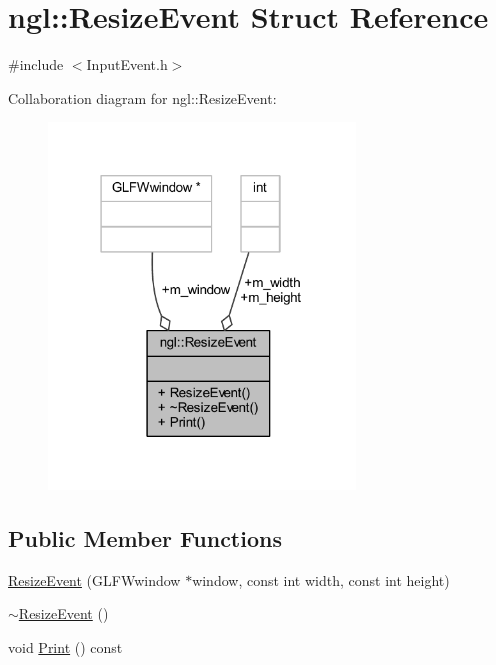 \hypertarget{structngl_1_1_resize_event}{}\section{ngl\+:\+:Resize\+Event Struct Reference}
\label{structngl_1_1_resize_event}


{\ttfamily \#include $<$Input\+Event.\+h$>$}



Collaboration diagram for ngl\+:\+:Resize\+Event\+:
\nopagebreak
\begin{figure}[H]
\begin{center}
\leavevmode
\includegraphics[width=231pt]{structngl_1_1_resize_event__coll__graph}
\end{center}
\end{figure}
\subsection*{Public Member Functions}
\begin{DoxyCompactItemize}
\item 
\mbox{\hyperlink{structngl_1_1_resize_event_a22840f56fde30d177d74b02f0b98982b}{Resize\+Event}} (G\+L\+F\+Wwindow $\ast$window, const int width, const int height)
\item 
\mbox{\hyperlink{structngl_1_1_resize_event_aee919bebf61e366131b5168be5c0db7d}{$\sim$\+Resize\+Event}} ()
\item 
void \mbox{\hyperlink{structngl_1_1_resize_event_a26b8d6fb21f659da3a2b8891bec52860}{Print}} () const
\end{DoxyCompactItemize}
